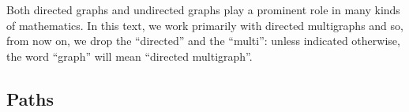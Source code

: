 
\begin{remark}
    Both directed graphs and undirected graphs play a prominent role in many kinds of mathematics.
    In this text, we work primarily with directed multigraphs and so, from now on, we drop the ``directed'' and the ``multi'': unless indicated otherwise, the word ``graph'' will mean ``directed multigraph''.

\end{remark}


\subsection{Paths}

